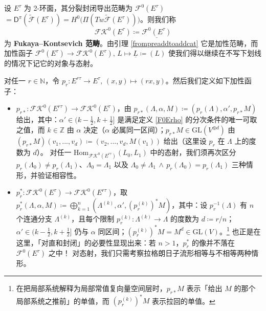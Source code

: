 \begin{Def}\label{FukayaKontsevichcat}
	设 $E^\tau$ 为 2-环面，其分裂封闭导出范畴为 $\mathscr{F}^0(E^\tau)$ $=\mathsf{D}^\pi(\widetilde{\mathscr{F}}(E^\tau))=H^0\big(\Pi(Tw\widetilde{\mathscr{F}}(E^\tau))\big)$。则我们称
	\[
	\mathscr{F\!K}^0(E^\tau)\coloneqq\underline{\mathscr{F}^0(E^\tau)}
	\]
	为 \textbf{Fukaya--Kontsevich 范畴}。由引理 \ref{frompreaddtoaddcat} 它是加性范畴，而加性函子 $\mathscr{F}^0(E^\tau)\rightarrow\mathscr{F\!K}^0(E^\tau),\,L\mapsto \underline{L}\coloneqq(L)$ 使我们得以继续在不写下划线的情况下记它的对象与态射。

	对任一 $r\in\mathbb{N}$，令 $p_r:E^{r\tau}\rightarrow E^\tau,\,(x,y)\mapsto(rx,y)$。然后我们定义如下加性函子：
	\begin{itemize}[leftmargin=0.5cm]
		\item $p_{r*}:\mathscr{F\!K}^0(E^{r\tau})\rightarrow \mathscr{F\!K}^0(E^\tau)$，由 $p_{r*}(\Lambda,\alpha,M)\coloneqq (p_r(\Lambda),\alpha',p_{r*}M)$ 给出，其中：$\alpha'\in(k-\frac{1}{2},k+\frac{1}{2}]$ 是满足定义 \ref{F0Erho} 的分次条件的唯一可取之值，而 $k\in\mathbb{Z}$ 由 $\alpha$ 决定（$\alpha$ 必属同一区间）；$p_{r*}M\in\text{GL}(V^{\oplus d})$ 由 $(p_{r*}M)(v_1,...,v_d)\coloneqq(v_2,...,v_d,M(v_1))$ 给出（这里设 $p_r$ 在 $\Lambda$ 上的度数为 $d$）。
		\newline 对任一 $\text{Hom}_{\mathscr{F\!K}^0(E^{r\tau})}(L_0,L_1)$ 中的态射，我们须再次区分 $p_r(\Lambda_0)\neq p_r(\Lambda_1)$、$\Lambda_0=\Lambda_1$ 以及 $\Lambda_0\neq\Lambda_1\,\wedge\,p_r(\Lambda_0)= p_r(\Lambda_1)$ 三种情形，并验证相容性。

		\item $p_r^*:\mathscr{F\!K}^0(E^\tau)\rightarrow\mathscr{F\!K}^0(E^{r\tau})$，取 $p_r^*(\Lambda,\alpha,M)\!\coloneqq\!\bigoplus_{k=1}^n (\Lambda^{(k)},\alpha',(p_r^{(k)})^*M)$，其中：设 $p_r^{-1}(\Lambda)$ 有 $n$ 个连通分支 $\Lambda^{(k)}$，且每个限制 $p_r^{(k)}:\Lambda^{(k)}\rightarrow\Lambda$ 的度数为 $d\coloneqq r/n$；$\alpha'\in(k-\frac{1}{2},k+\frac{1}{2}]$ 仍与 $\alpha$ 同区间；$(p_r^{(k)})^*M=M^d\in\text{GL}(V)$。\footnote{在把局部系统解释为局部常值复向量空间层时，$p_{r*}M$ 表示「给出 $M$ 的那个局部系统之推前」的单值，而 $(p_r^{(k)})^*M$ 表示拉回的单值。} 也正是在这里，「对直和封闭」的必要性显现出来：若 $n>1$，$p_r^*$ 的像并不落在 $\mathscr{F}^0(E^\tau)$ 之中！
		\newline 对态射，我们只需考察拉格朗日子流形相等与不相等两种情形。
	\end{itemize}
\end{Def}

